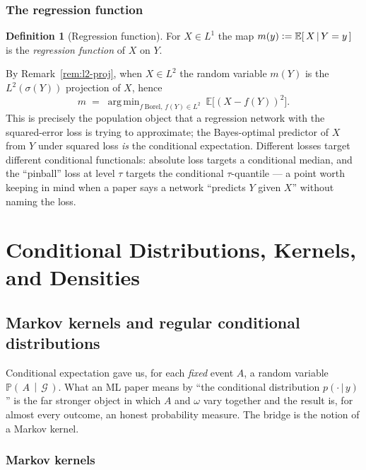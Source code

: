 \documentclass[11pt,oneside]{report}
\theoremstyle{plain}
\theoremstyle{definition}
\newtheorem{definition}[theorem]{Definition}
\theoremstyle{remark}
\newcommand{\Prob}{\mathbb{P}}
\newcommand{\E}{\mathbb{E}}
\newcommand{\Gcal}{\mathcal{G}}
\newcommand{\defeq}{\vcentcolon=}
\newcommand{\given}{\,\vert\,}
\DeclareMathOperator*{\argmin}{arg\,min}
\newcommand{\cE}[2]{\E\!\left[\,#1 \,\middle|\, #2\,\right]}
\newcommand{\cProb}[2]{\Prob\!\left(\,#1 \,\middle|\, #2\,\right)}
\numberwithin{equation}{chapter}
\begin{document}
\section{The regression function}

\begin{definition}[Regression function]
For $X\in L^1$ the map $m(y)\defeq\cE{X}{Y=y}$ is the \emph{regression
function} of $X$ on $Y$.
\end{definition}

By Remark~\ref{rem:l2-proj}, when $X\in L^2$ the random variable $m(Y)$ is
the $L^2(\sigma(Y))$ projection of $X$, hence
\begin{equation}
  m\;=\;\argmin_{f\ \text{Borel},\,f(Y)\in L^2}\ \E\bigl[(X-f(Y))^2\bigr].
\end{equation}
This is precisely the population object that a regression network with the
squared-error loss is trying to approximate; the Bayes-optimal predictor of
$X$ from $Y$ under squared loss \emph{is} the conditional expectation.
Different losses target different conditional functionals: absolute loss
targets a conditional median, and the ``pinball'' loss at level $\tau$
targets the conditional $\tau$-quantile --- a point worth keeping in mind
when a paper says a network ``predicts $Y$ given $X$'' without naming the
loss.

\part{Conditional Distributions, Kernels, and Densities}\label{part:cond-dist}

\chapter{Markov kernels and regular conditional distributions}
\label{ch:cond-dist}

Conditional expectation gave us, for each \emph{fixed} event $A$, a random
variable $\cProb{A}{\Gcal}$. What an ML paper means by ``the conditional
distribution $p(\cdot\given y)$'' is the far stronger object in which $A$
and $\omega$ vary together and the result is, for almost every outcome, an
honest probability measure. The bridge is the notion of a Markov kernel.

\section{Markov kernels}
\end{document}
